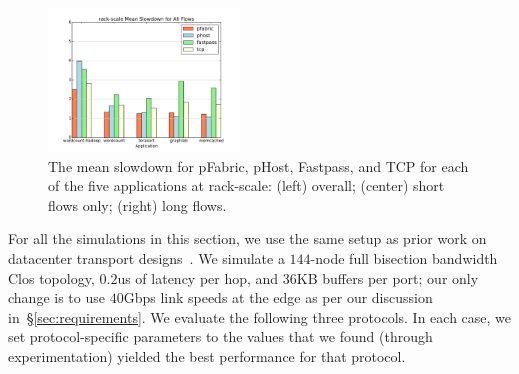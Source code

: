 %
\begin{figure}
  \centering
    \includegraphics[width = 2in]{img/fig12_rack-scale_slowdowns} 
  \caption{\small{The mean slowdown for pFabric, pHost, Fastpass, and TCP for each of the five applications at rack-scale: (left) overall; (center) short flows only; (right) long flows.}}
  \label{fig:phostp-rs}
\end{figure}
%
For all the simulations in this section, we use the same setup as prior work on datacenter transport designs~\cite{pfabric, phost}. We simulate a $144$-node full bisection bandwidth Clos topology, $0.2$us of latency per hop, and $36$KB buffers per port; our only change is to use $40$Gbps link speeds at the edge as per our discussion in~\S\ref{sec:requirements}. We evaluate the following three protocols. In each case, we set protocol-specific parameters to the values that we found (through experimentation) yielded the best performance for that protocol.


